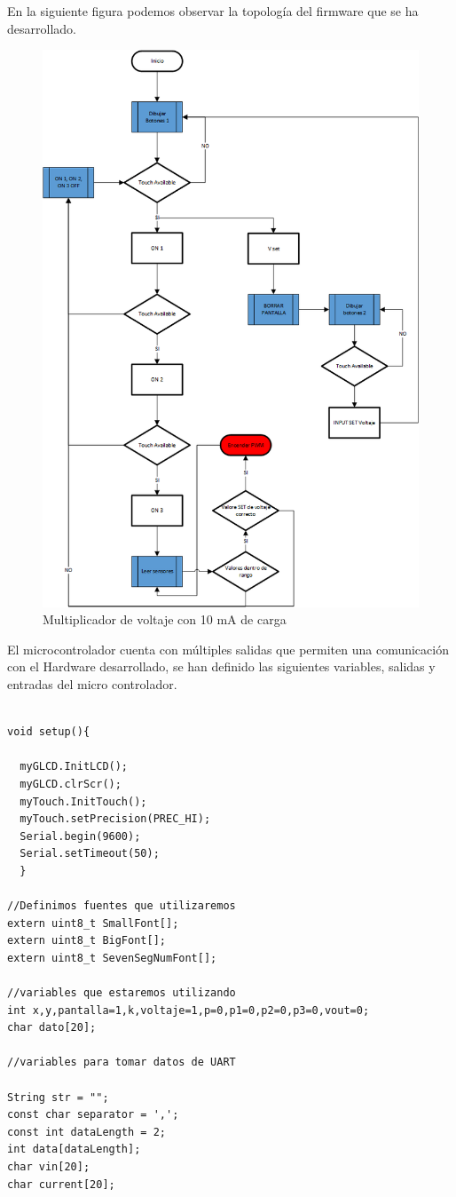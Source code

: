 En la siguiente figura podemos observar la topología del firmware que se ha desarrollado.\\

\begin{figure}[H]
\centering
\includegraphics[width=12cm]{Capitulo3/figs/diagramafir.png}
\caption{Multiplicador de voltaje con 10 mA de carga}
\end{figure}


El microcontrolador cuenta con múltiples salidas que permiten una comunicación con el Hardware desarrollado, se han definido las siguientes variables, salidas y entradas del micro controlador.

\begin{verbatim}

void setup(){

  myGLCD.InitLCD();
  myGLCD.clrScr();
  myTouch.InitTouch();
  myTouch.setPrecision(PREC_HI);
  Serial.begin(9600);
  Serial.setTimeout(50);
  }

//Definimos fuentes que utilizaremos
extern uint8_t SmallFont[];
extern uint8_t BigFont[];
extern uint8_t SevenSegNumFont[];

//variables que estaremos utilizando
int x,y,pantalla=1,k,voltaje=1,p=0,p1=0,p2=0,p3=0,vout=0;
char dato[20];

//variables para tomar datos de UART

String str = "";
const char separator = ',';
const int dataLength = 2;
int data[dataLength];
char vin[20];
char current[20];

\end{verbatim}


